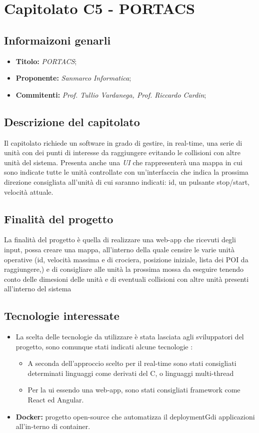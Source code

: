 \section{Capitolato C5 - PORTACS}
\subsection{Informaizoni genarli}
\begin{itemize}
    \item \textbf{Titolo:} \textit{PORTACS};
    \item \textbf{Proponente:} \textit{Sanmarco Informatica};
    \item \textbf{Commitenti:} \textit{Prof. Tullio Vardanega, Prof. Riccardo Cardin};
\end{itemize}
\subsection{Descrizione del capitolato}
Il capitolato richiede un software in grado di gestire, in real-time, una serie di unità con dei punti di interesse da raggiungere evitando le collisioni con altre unità del sistema. 
Presenta anche una \textit{UI} che rappresenterà una mappa in cui sono indicate tutte le unità controllate con un'interfaccia che indica la prossima direzione consigliata 
all'unità di cui saranno indicati: id, un pulsante stop/start, velocità attuale.
\subsection{Finalità del progetto}
La finalità del progetto è quella di realizzare una web-app che ricevuti degli input, possa creare una mappa, all'interno della quale censire le varie unità operative 
(id, velocità massima e di crociera, posizione iniziale, lista dei POI da raggiungere,) e di consigliare 
alle unità la prossima mossa da eseguire tenendo conto delle dimesioni delle unità e di eventuali collisioni con altre unità presenti all'interno del sistema 
\subsection{Tecnologie interessate}
\begin{itemize}
    \item La scelta delle tecnologie da utilizzare è stata lasciata agli sviluppatori del progetto, sono comunque stati indicati alcune tecnologie :
    \begin{itemize}
        \item A seconda dell'approccio scelto per il real-time sono stati consigliati determinati linguaggi come derivati del C, o linguaggi multi-thread
        \item Per la ui essendo una web-app, sono stati consigliati framework come React ed Angular.
    \end{itemize}
    \item \textbf{Docker:} progetto open-source che automatizza il deploymentGdi applicazioni all’in-terno di container.
\end{itemize}
